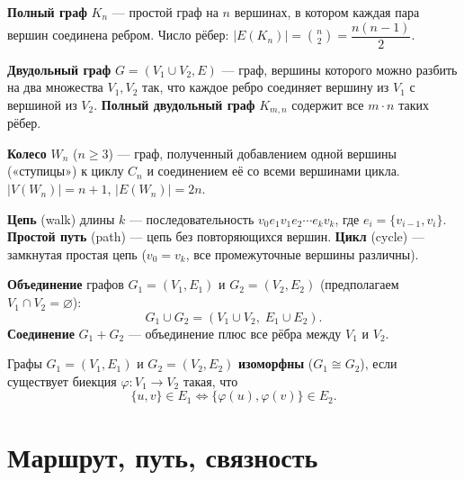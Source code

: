 \documentclass[12pt]{article}
\begin{document}
\begin{definition}
\textbf{Полный граф} $K_n$ --- простой граф на $n$ вершинах,
в котором каждая пара вершин соединена ребром. Число рёбер:
$|E(K_n)| = \binom{n}{2} = \dfrac{n(n-1)}{2}$.
\end{definition}

\begin{definition}
\textbf{Двудольный граф} $G = (V_1 \cup V_2, E)$ --- граф,
вершины которого можно разбить на два множества $V_1, V_2$
так, что каждое ребро соединяет вершину из $V_1$ с вершиной
из $V_2$. \textbf{Полный двудольный граф} $K_{m,n}$ содержит
все $m \cdot n$ таких рёбер.
\end{definition}

\begin{definition}
\textbf{Колесо} $W_n$ ($n \geq 3$) --- граф, полученный добавлением
одной вершины («ступицы») к циклу $C_n$ и соединением её со всеми
вершинами цикла. $|V(W_n)| = n+1$, $|E(W_n)| = 2n$.
\end{definition}

\begin{definition}
\textbf{Цепь} (walk) длины $k$ --- последовательность
$v_0 e_1 v_1 e_2 \cdots e_k v_k$, где $e_i = \{v_{i-1},v_i\}$.
\textbf{Простой путь} (path) --- цепь без повторяющихся вершин.
\textbf{Цикл} (cycle) --- замкнутая простая цепь ($v_0 = v_k$,
все промежуточные вершины различны).
\end{definition}

\begin{definition}
\textbf{Объединение} графов $G_1 = (V_1,E_1)$ и $G_2=(V_2,E_2)$
(предполагаем $V_1 \cap V_2 = \varnothing$):
\[
G_1 \cup G_2 = (V_1 \cup V_2,\; E_1 \cup E_2).
\]
\textbf{Соединение} $G_1 + G_2$ --- объединение плюс все рёбра
между $V_1$ и $V_2$.
\end{definition}

\begin{definition}
Графы $G_1 = (V_1,E_1)$ и $G_2 = (V_2,E_2)$ \textbf{изоморфны}
($G_1 \cong G_2$), если существует биекция $\varphi\colon V_1 \to V_2$
такая, что
\[
\{u,v\} \in E_1 \iff \{\varphi(u),\varphi(v)\} \in E_2.
\]
\end{definition}

\section{Маршрут, путь, связность}
\end{document}
